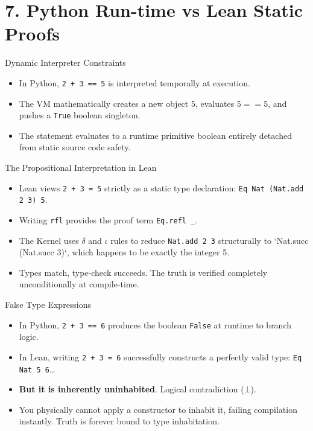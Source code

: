\documentclass[12pt, aspectratio=169]{beamer}
\begin{document}
\section{7. Python Run-time vs Lean Static Proofs}

\begin{frame}{Dynamic Interpreter Constraints}
\begin{itemize}\setlength{\itemsep}{1.2em}
  \item In Python, \texttt{2 + 3 == 5} is interpreted temporally at execution.
  \item The VM mathematically creates a new object $5$, evaluates $5 == 5$, and pushes a \texttt{True} boolean singleton.
  \item The statement evaluates to a runtime primitive boolean entirely detached from static source code safety.
\end{itemize}
\end{frame}

\begin{frame}{The Propositional Interpretation in Lean}
\begin{itemize}\setlength{\itemsep}{1.2em}
  \item Lean views \texttt{2 + 3 = 5} strictly as a static type declaration: \texttt{Eq Nat (Nat.add 2 3) 5}.
  \item Writing \texttt{rfl} provides the proof term \texttt{Eq.refl \_}.
  \item The Kernel uses $\delta$ and $\iota$ rules to reduce \texttt{Nat.add 2 3} structurally to `Nat.succ (Nat.succ 3)`, which happens to be exactly the integer 5.
  \item Types match, type-check succeeds. The truth is verified completely unconditionally at compile-time.
\end{itemize}
\end{frame}

\begin{frame}{False Type Expressions}
\begin{itemize}\setlength{\itemsep}{1.2em}
  \item In Python, \texttt{2 + 3 == 6} produces the boolean \texttt{False} at runtime to branch logic.
  \item In Lean, writing \texttt{2 + 3 = 6} successfully constructs a perfectly valid type: \texttt{Eq Nat 5 6}\dots
  \item \textbf{But it is inherently uninhabited}. Logical contradiction ($\bot$).
  \item You physically cannot apply a constructor to inhabit it, failing compilation instantly. Truth is forever bound to type inhabitation.
\end{itemize}
\end{frame}
\end{document}
